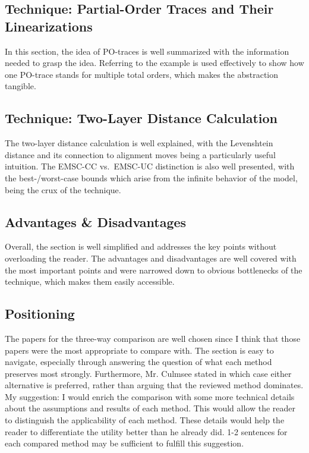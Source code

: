 \documentclass{llncs}
\begin{document}
\subsection{Technique: Partial-Order Traces and Their Linearizations}

In this section, the idea of PO-traces is well summarized with the information needed to grasp the idea. Referring to the example is used effectively to show how one PO-trace stands for multiple total orders, which makes the abstraction tangible. 

\subsection{Technique: Two-Layer Distance Calculation}

The two-layer distance calculation is well explained, with the Levenshtein distance and its connection to alignment moves being a particularly useful intuition. The EMSC-CC vs.\ EMSC-UC distinction is also well presented, with the best-/worst-case bounds which arise from the infinite behavior of the model, being the crux of the technique. 

\subsection{Advantages \& Disadvantages}

Overall, the section is well simplified and addresses the key points without overloading the reader. The advantages and disadvantages are well covered with the most important points and were narrowed down to obvious bottlenecks of the technique, which makes them easily accessible.

\subsection{Positioning}

The papers for the three-way comparison are well chosen since I think that those papers were the most appropriate to compare with. The section is easy to navigate, especially through answering the question of what each method preserves most strongly. Furthermore, Mr. Culmsee stated in which case either alternative is preferred, rather than arguing that the reviewed method dominates. My suggestion: I would enrich the comparison with some more technical details about the assumptions and results of each method. This would allow the reader to distinguish the applicability of each method. These details would help the reader to differentiate the utility better than he already did. 1-2 sentences for each compared method may be sufficient to fulfill this suggestion.
\end{document}
